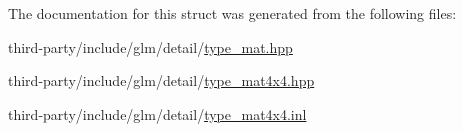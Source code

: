 The documentation for this struct was generated from the following files\+:\begin{DoxyCompactItemize}
\item 
third-\/party/include/glm/detail/\hyperlink{type__mat_8hpp}{type\+\_\+mat.\+hpp}\item 
third-\/party/include/glm/detail/\hyperlink{type__mat4x4_8hpp}{type\+\_\+mat4x4.\+hpp}\item 
third-\/party/include/glm/detail/\hyperlink{type__mat4x4_8inl}{type\+\_\+mat4x4.\+inl}\end{DoxyCompactItemize}
